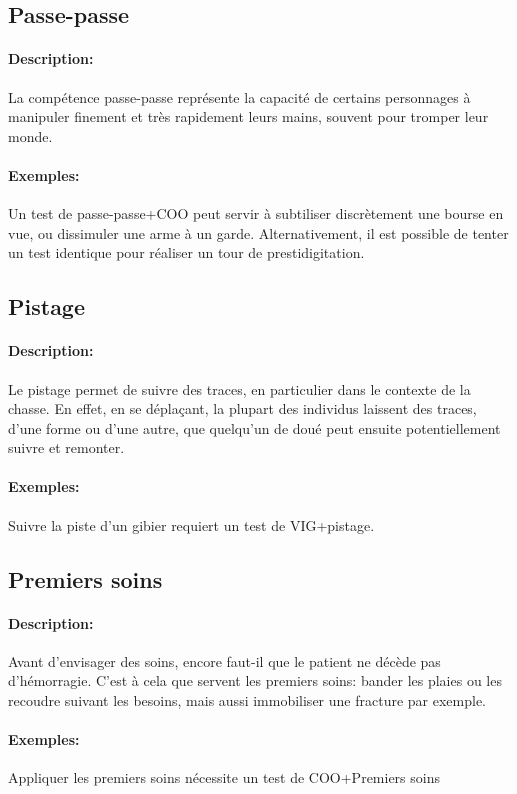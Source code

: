 \documentclass[10pt,a4paper,twocolumn]{book}
\begin{document}
\subsection{Passe-passe}
\paragraph{Description:}La compétence passe-passe représente la capacité de certains personnages à manipuler finement et très rapidement leurs mains, souvent pour tromper leur monde.
\paragraph{Exemples:}Un test de passe-passe+COO peut servir à subtiliser discrètement une bourse en vue, ou dissimuler une arme à un garde. Alternativement, il est possible de tenter un test identique pour réaliser un tour de prestidigitation.
\subsection{Pistage}
\paragraph{Description:}Le pistage permet de suivre des traces, en particulier dans le contexte de la chasse. En effet, en se déplaçant, la plupart des individus laissent des traces, d'une forme ou d'une autre, que quelqu'un de doué peut ensuite potentiellement suivre et remonter.
\paragraph{Exemples:}Suivre la piste d'un gibier requiert un test de VIG+pistage.
\subsection{Premiers soins}
\paragraph{Description:}Avant d'envisager des soins, encore faut-il que le patient ne décède pas d'hémorragie. C'est à cela que servent les premiers soins: bander les plaies ou les recoudre suivant les besoins, mais aussi immobiliser une fracture par exemple.
\paragraph{Exemples:}Appliquer les premiers soins nécessite un test de COO+Premiers soins
\end{document}
